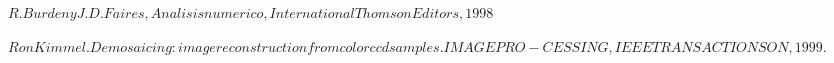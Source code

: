 \begin{thebibliography}{9}

  $R. Burden y J.D.Faires, Analisis numerico, International Thomson Editors, 1998$

$Ron Kimmel. Demosaicing: image reconstruction from color ccd samples. IMAGE PRO-
CESSING, IEEE TRANSACTIONS ON, 1999.$

\end{thebibliography}